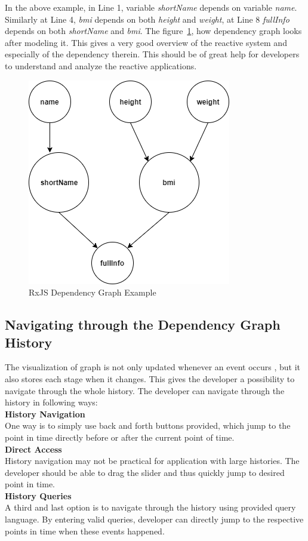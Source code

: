 In the above example, in Line 1, variable \textit{shortName} depends on variable \textit{name}. Similarly at Line 4, \textit{bmi} depends on both \textit{height} and \textit{weight}, at Line 8 \textit{fullInfo} depends on both \textit{shortName} and \textit{bmi}. The figure~\ref{fig:rxjs-dependency-graph-example}, how dependency graph looks after modeling it. This gives a very good overview of the reactive system and especially of the dependency therein. This should be of great help for developers to understand and analyze the reactive applications. 

\begin{figure}[!h]
	\centering
	\includegraphics[scale=0.5,trim=0 0 0 0]{images/rxjs-dependency-graph-example.png}
	\caption{RxJS Dependency Graph Example}
	\label{fig:rxjs-dependency-graph-example}
\end{figure}

\subsection{Navigating through the Dependency Graph History}
The visualization of graph is not only updated whenever an event occurs , but it also stores each stage when it changes. This gives the developer a possibility to navigate through the whole history. The developer can navigate through the history in following ways:
\\
\textbf{History Navigation}
\\
One way is to simply use back and forth buttons provided, which jump to the point in time directly before or after the current point of time.
\\
\textbf{Direct Access}
\\
History navigation may not be practical for application with large histories. The developer should be able to drag the slider and thus quickly jump to desired point in time.
\\
\textbf{History Queries}
\\
A third and last option is to navigate through the history using provided query language. By entering valid queries, developer can directly jump to the respective points in time when these events happened.

